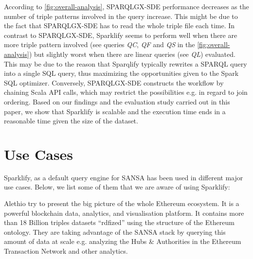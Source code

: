 
According to \autoref{fig:overall-analysis}, SPARQLGX-SDE performance decreases as the number of triple patterns involved in the query increase. %
This might be due to the fact that SPARQLGX-SDE has to read the whole triple file each time.
In contrast to SPARQLGX-SDE, Sparklify seems to perform well when there are more triple pattern involved (see queries \textit{QC}, \textit{QF} and \textit{QS} in the \autoref{fig:overall-analysis}) but slightly worst when there are linear queries (see \textit{QL}) evaluated. 
This may be due to the reason that Sparqlify typically rewrites a SPARQL query into a single SQL query, thus maximizing the opportunities given to the Spark SQL optimizer. Conversely, SPARQLGX-SDE constructs the workflow by chaining Scala API calls, which may restrict the possibilities e.g. in regard to join ordering.
Based on our findings and the evaluation study carried out in this paper, we show that Sparklify is scalable and the execution time ends in a reasonable time given the size of the dataset.

\section{Use Cases} 
\label{sec:use_cases}

Sparklify, as a default query engine for SANSA has been used in different major use cases. 
Below, we list some of them that we are aware of using Sparklify:

 Alethio try to present the big picture of the whole Ethereum ecosystem.
It is a powerful blockchain data, analytics, and visualisation platform.
It contains more than 18 Billion triples datasets ``rdfized'' using the structure of the Ethereum ontology.
They are taking advantage of the SANSA stack by querying this amount of data at scale e.g. analyzing the Hubs \& Authorities in the Ethereum Transaction Network and other analytics.

